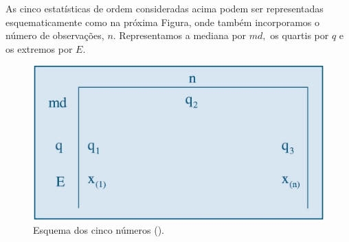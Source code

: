 \documentclass[14pt,aspectratio=1610]{beamer}
\begin{document}
\begin{frame}{}
\frametitle{}
\begin{block}{}
\justifying
As cinco estatísticas de ordem consideradas acima podem ser representadas esquematicamente como na próxima Figura, onde também incorporamos o número de 
observações, $n.$ Representamos a mediana por $md,$ os quartis por $q$ e os extremos por $E.$
\begin{figure}[H]
    \centering
    \includegraphics[scale=0.5]{Fig8}
    \caption{Esquema dos cinco números (\cite{Morettin09}).}
    \label{Fig8_ex}
  \end{figure}
\end{block}
\end{frame}
\end{document}
